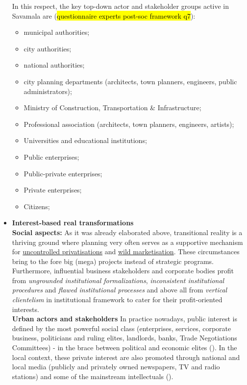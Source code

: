\documentclass[11pt]{report}
\begin{document}
\begin{itemize}
In this respect, the key top-down actor and stakeholder groups active in Savamala are (\hl{questionnaire experts post-soc framework q7}):

\begin{itemize}
\item municipal authorities;
\item city authorities;
\item national authorities;
\item city planning departments (architects, town planners, engineers, public administrators);
\item Ministry of Construction, Transportation \& Infrastructure;
\item Professional association (architects, town planners, engineers, artists);
\item Universities and educational institutions;
\item Public enterprises;
\item Public-private enterprises;
\item Private enterprises;
\item Citizens;
\end{itemize}

\item \textbf{Interest-based real transformations}
\\

\textbf{Social aspects:}
As it was already elaborated above, transitional reality is a thriving ground where planning very often serves as a supportive mechanism for
\underline{uncontrolled privatisations} and \underline{wild marketisation}.
These circumstances bring to the fore big (mega) projects instead of strategic programs.
Furthermore, influential business stakeholders and corporate bodies profit from
\textit{ungrounded institutional formalizations}, \textit{inconsistent institutional procedures} and \textit{flawed institutional processes} and above all from \textit{vertical clientelism} in institutional framework to cater for their profit-oriented interests.
\\

\textbf{Urban actors and stakeholders}
In  practice nowadays, public interest is defined by the most powerful social class (enterprises, services, corporate business, politicians and ruling elites, landlords, banks, Trade Negotiations Committees) - in the brace between political and economic elites (\cite{ Urbani razvoj u Srbiji Ministry of Space 2014}).
In the local context, these private interest are also promoted through national and local media (publicly and privately owned newspapers, TV and radio stations) and some of the mainstream intellectuals (\cite{cenzolovka tamara tekst}).


\end{itemize}
\end{document}
